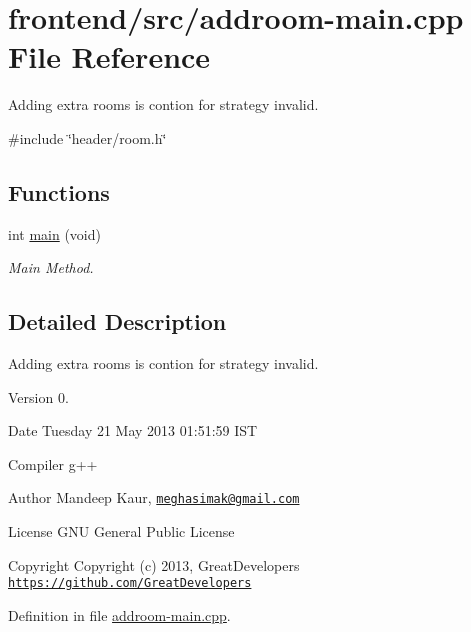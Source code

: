 \hypertarget{addroom-main_8cpp}{\section{frontend/src/addroom-\/main.cpp \-File \-Reference}
\label{addroom-main_8cpp}
}


\-Adding extra rooms is contion for strategy invalid.  


{\ttfamily \#include \char`\"{}header/room.\-h\char`\"{}}\*
\subsection*{\-Functions}
\begin{DoxyCompactItemize}
\item 
int \hyperlink{addroom-main_8cpp_a568b3afc214ba30be5bf526d6b27b611}{main} (void)
\begin{DoxyCompactList}\small\item\em \-Main \-Method. \end{DoxyCompactList}\end{DoxyCompactItemize}


\subsection{\-Detailed \-Description}
\-Adding extra rooms is contion for strategy invalid. \begin{DoxyVersion}{\-Version}
0. 
\end{DoxyVersion}
\begin{DoxyDate}{\-Date}
\-Tuesday 21 \-May 2013 01\-:51\-:59 \-I\-S\-T\par
 \-Compiler g++
\end{DoxyDate}
\begin{DoxyAuthor}{\-Author}
\-Mandeep \-Kaur, \href{mailto:meghasimak@gmail.com}{\tt meghasimak@gmail.\-com}\par
 \-License \-G\-N\-U \-General \-Public \-License 
\end{DoxyAuthor}
\begin{DoxyCopyright}{\-Copyright}
\-Copyright (c) 2013, \-Great\-Developers \href{https://github.com/GreatDevelopers}{\tt https\-://github.\-com/\-Great\-Developers} 
\end{DoxyCopyright}


\-Definition in file \hyperlink{addroom-main_8cpp_source}{addroom-\/main.\-cpp}.



